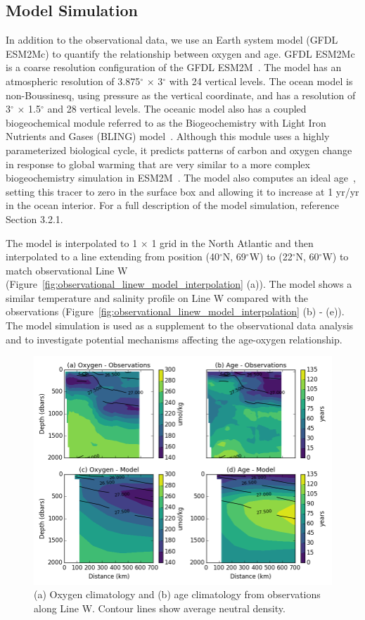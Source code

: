 \subsection{Model Simulation}
In addition to the observational data, we use an Earth system model (GFDL ESM2Mc)
to quantify the relationship between oxygen and age. GFDL ESM2Mc~\citep{Galbraith2011}
is a coarse resolution configuration of the GFDL ESM2M~\citep{Dunne2012}. The model
has an atmospheric resolution of 3.875$^{\circ}$ $\times$ 3$^{\circ}$  with 24 vertical levels. The ocean
model is non-Boussinesq, using pressure as the vertical coordinate, and has a
resolution of 3$^{\circ}$ $\times$ 1.5$^{\circ}$  and 28 vertical levels. The oceanic model also has a
coupled biogeochemical module referred to as the Biogeochemistry with Light Iron
Nutrients and Gases (BLING) model~\citep{Galbraith2010}. Although this module
uses a highly parameterized biological cycle, it predicts patterns of carbon and
oxygen change in response to global warming that are very similar to a more
complex biogeochemistry simulation in ESM2M~\citep{Small2014}. The model
also computes an ideal age~\citep{Thiele1990}, setting this tracer to
zero in the surface box and allowing it to increase at 1 yr/yr in the ocean
interior. For a full description of the model simulation, reference Section 3.2.1.

The model is interpolated to 1 $\times$ 1  grid in the North Atlantic and then
interpolated to a line extending from position (40$^{\circ}$N, 69$^{\circ}$W)
to (22$^{\circ}$N, 60$^{\circ}$W) to match observational Line W
(Figure~\ref{fig:observational_linew_model_interpolation} (a)). The model shows
a similar temperature and salinity profile on Line W compared with the
observations (Figure~\ref{fig:observational_linew_model_interpolation} (b) - (e)).
The model simulation is used as a supplement to the observational data analysis
and to investigate potential mechanisms affecting the age-oxygen relationship.

\begin{figure}
\centering
\includegraphics[width=\linewidth]{age_oxygen_climatology.png}
\caption{(a) Oxygen climatology and (b) age climatology from observations along Line W. Contour lines show average neutral density. }
\label{fig:oxygen_age_climatology}
\end{figure}

